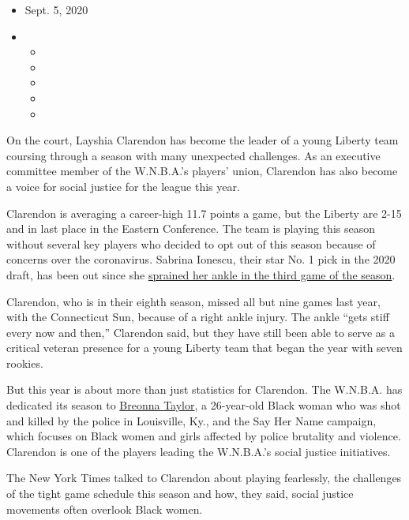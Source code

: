 \begin{itemize}
\item
  Sept. 5, 2020
\item
  \begin{itemize}
  \item
  \item
  \item
  \item
  \item
  \end{itemize}
\end{itemize}

On the court, Layshia Clarendon has become the leader of a young Liberty
team coursing through a season with many unexpected challenges. As an
executive committee member of the W.N.B.A.'s players' union, Clarendon
has also become a voice for social justice for the league this year.

Clarendon is averaging a career-high 11.7 points a game, but the Liberty
are 2-15 and in last place in the Eastern Conference. The team is
playing this season without several key players who decided to opt out
of this season because of concerns over the coronavirus. Sabrina
Ionescu, their star No. 1 pick in the 2020 draft, has been out since she
\href{https://www.nytimes3xbfgragh.onion/2020/08/01/sports/basketball/sabrina-ionescu-injury.html}{sprained
her ankle in the third game of the season}.

Clarendon, who is in their eighth season, missed all but nine games last
year, with the Connecticut Sun, because of a right ankle injury. The
ankle ``gets stiff every now and then,'' Clarendon said, but they have
still been able to serve as a critical veteran presence for a young
Liberty team that began the year with seven rookies.

But this year is about more than just statistics for Clarendon. The
W.N.B.A. has dedicated its season to
\href{https://www.nytimes3xbfgragh.onion/2020/07/25/sports/wnba-seattle-storm-new-york-liberty.html?searchResultPosition=3}{Breonna
Taylor}, a 26-year-old Black woman who was shot and killed by the police
in Louisville, Ky., and the Say Her Name campaign, which focuses on
Black women and girls affected by police brutality and violence.
Clarendon is one of the players leading the W.N.B.A.'s social justice
initiatives.

The New York Times talked to Clarendon about playing fearlessly, the
challenges of the tight game schedule this season and how, they said,
social justice movements often overlook Black women.

